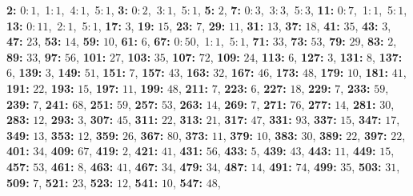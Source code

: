 \textsf{\bfseries 2:} 0:\,$1$,\ 1:\,$1$,\ 4:\,$1$,\ 5:\,$1$, \textsf{\bfseries 3:} 0:\,$2$,\ 3:\,$1$,\ 5:\,$1$, \textsf{\bfseries 5:} $2$, \textsf{\bfseries 7:} 0:\,$3$,\ 3:\,$3$,\ 5:\,$3$, \textsf{\bfseries 11:} 0:\,$7$,\ 1:\,$1$,\ 5:\,$1$, \textsf{\bfseries 13:} 0:\,$11$,\ 2:\,$1$,\ 5:\,$1$, \textsf{\bfseries 17:} $3$, \textsf{\bfseries 19:} $15$, \textsf{\bfseries 23:} $7$, \textsf{\bfseries 29:} $11$, \textsf{\bfseries 31:} $13$, \textsf{\bfseries 37:} $18$, \textsf{\bfseries 41:} $35$, \textsf{\bfseries 43:} $3$, \textsf{\bfseries 47:} $23$, \textsf{\bfseries 53:} $14$, \textsf{\bfseries 59:} $10$, \textsf{\bfseries 61:} $6$, \textsf{\bfseries 67:} 0:\,$50$,\ 1:\,$1$,\ 5:\,$1$, \textsf{\bfseries 71:} $33$, \textsf{\bfseries 73:} $53$, \textsf{\bfseries 79:} $29$, \textsf{\bfseries 83:} $2$, \textsf{\bfseries 89:} $33$, \textsf{\bfseries 97:} $56$, \textsf{\bfseries 101:} $27$, \textsf{\bfseries 103:} $35$, \textsf{\bfseries 107:} $72$, \textsf{\bfseries 109:} $24$, \textsf{\bfseries 113:} $6$, \textsf{\bfseries 127:} $3$, \textsf{\bfseries 131:} $8$, \textsf{\bfseries 137:} $6$, \textsf{\bfseries 139:} $3$, \textsf{\bfseries 149:} $51$, \textsf{\bfseries 151:} $7$, \textsf{\bfseries 157:} $43$, \textsf{\bfseries 163:} $32$, \textsf{\bfseries 167:} $46$, \textsf{\bfseries 173:} $48$, \textsf{\bfseries 179:} $10$, \textsf{\bfseries 181:} $41$, \textsf{\bfseries 191:} $22$, \textsf{\bfseries 193:} $15$, \textsf{\bfseries 197:} $11$, \textsf{\bfseries 199:} $48$, \textsf{\bfseries 211:} $7$, \textsf{\bfseries 223:} $6$, \textsf{\bfseries 227:} $18$, \textsf{\bfseries 229:} $7$, \textsf{\bfseries 233:} $59$, \textsf{\bfseries 239:} $7$, \textsf{\bfseries 241:} $68$, \textsf{\bfseries 251:} $59$, \textsf{\bfseries 257:} $53$, \textsf{\bfseries 263:} $14$, \textsf{\bfseries 269:} $7$, \textsf{\bfseries 271:} $76$, \textsf{\bfseries 277:} $14$, \textsf{\bfseries 281:} $30$, \textsf{\bfseries 283:} $12$, \textsf{\bfseries 293:} $3$, \textsf{\bfseries 307:} $45$, \textsf{\bfseries 311:} $22$, \textsf{\bfseries 313:} $21$, \textsf{\bfseries 317:} $47$, \textsf{\bfseries 331:} $93$, \textsf{\bfseries 337:} $15$, \textsf{\bfseries 347:} $17$, \textsf{\bfseries 349:} $13$, \textsf{\bfseries 353:} $12$, \textsf{\bfseries 359:} $26$, \textsf{\bfseries 367:} $80$, \textsf{\bfseries 373:} $11$, \textsf{\bfseries 379:} $10$, \textsf{\bfseries 383:} $30$, \textsf{\bfseries 389:} $22$, \textsf{\bfseries 397:} $22$, \textsf{\bfseries 401:} $34$, \textsf{\bfseries 409:} $67$, \textsf{\bfseries 419:} $2$, \textsf{\bfseries 421:} $41$, \textsf{\bfseries 431:} $56$, \textsf{\bfseries 433:} $5$, \textsf{\bfseries 439:} $43$, \textsf{\bfseries 443:} $11$, \textsf{\bfseries 449:} $15$, \textsf{\bfseries 457:} $53$, \textsf{\bfseries 461:} $8$, \textsf{\bfseries 463:} $41$, \textsf{\bfseries 467:} $34$, \textsf{\bfseries 479:} $34$, \textsf{\bfseries 487:} $14$, \textsf{\bfseries 491:} $74$, \textsf{\bfseries 499:} $35$, \textsf{\bfseries 503:} $31$, \textsf{\bfseries 509:} $7$, \textsf{\bfseries 521:} $23$, \textsf{\bfseries 523:} $12$, \textsf{\bfseries 541:} $10$, \textsf{\bfseries 547:} $48$, 
